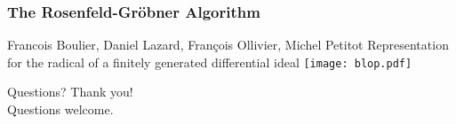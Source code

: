 \documentclass[11pt]{beamer}
\begin{document}
\begin{frame}
\frametitle{The Rosenfeld-Gr\"obner Algorithm}
\begin{exampleblock}{Francois Boulier, Daniel Lazard, François Ollivier, Michel Petitot
Representation for the radical of a finitely generated differential ideal
}
\texttt{[image: blop.pdf]}
\end{exampleblock}
\end{frame}

\begin{frame}{Questions?}
  \centering
  \Huge Thank you! \\
  \vspace{1cm}
  \Large Questions welcome.
\end{frame}
\end{document}
